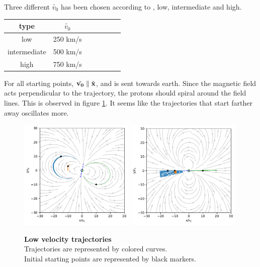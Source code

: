 \documentclass[11pt]{article}
\begin{document}
\noindent Three different $\tilde{v_0}$ has been chosen according to \cite{solar_wind}, low, intermediate and high.
\begin{center}
\begin{tabular}{|c|c|c|c|c|c|c|}
\hline
    type & $\tilde{v_0}$ \\ 
\hline
    low & 250 km/s\\
    intermediate & 500 km/s\\
    high & 750 km/s\\
\hline
\end{tabular}
\label{table:constants}
\end{center}
\noindent For all starting points, $\tilde{\vectorbold{v_0}} \parallel \hat{\vectorbold{x}}$, and is sent towards earth. Since the magnetic field acts perpendicular to the trajectory, the protons should spiral around the field lines. This is observed in figure \ref{fig:low_trajectories}. It seems like the trajectories that start farther away oscillates more. 
\newpage
\begin{figure}[!htp]
    \centering
    \captionsetup{justification=centering}
    \includegraphics[width=0.49\textwidth]{../figures/report/trajectoriesLowXZ}
    \includegraphics[width=0.49\textwidth]{../figures/report/trajectoriesLowXY}
    \caption{\textbf{Low velocity trajectories}\\Trajectories are represented by colored curves.\\Initial starting points are represented by black markers.}
    \label{fig:low_trajectories}
\end{figure}
\end{document}
